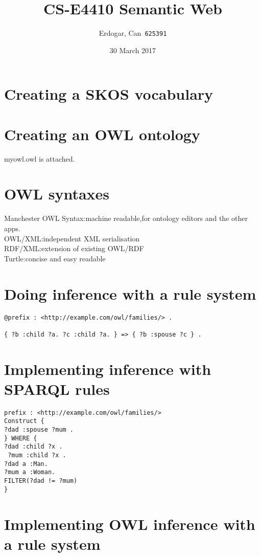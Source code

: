 \documentclass{article}
\title{CS-E4410 Semantic Web}
\author{
  Erdogar, Can\      \texttt{625391}
}
\date{ 30 March 2017}
\begin{document}
\maketitle

\section{Creating a SKOS vocabulary}

\section{Creating an OWL ontology}

myowl.owl is attached.

\section{OWL syntaxes}

Manchester OWL Syntax:machine readable,for ontology editors and the other apps. \\
OWL/XML:independent XML serialisation \\
RDF/XML:extension of existing OWL/RDF \\
Turtle:concise and easy readable \\

\section{Doing inference with a rule system}

\begin{verbatim}
@prefix : <http://example.com/owl/families/> .

{ ?b :child ?a. ?c :child ?a. } => { ?b :spouse ?c } .
\end{verbatim}

\section{Implementing inference with SPARQL rules}

\begin{verbatim}
prefix : <http://example.com/owl/families/>
Construct {
?dad :spouse ?mum .
} WHERE {
?dad :child ?x .
 ?mum :child ?x .
?dad a :Man.
?mum a :Woman.
FILTER(?dad != ?mum)
}

\end{verbatim}

\section{Implementing OWL inference with a rule system}
\end{document}
